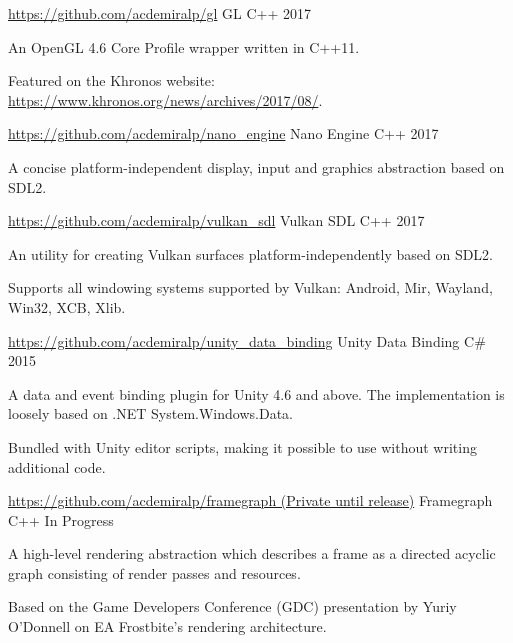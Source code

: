 \begin{cventries}
  \cventry
    {\href{https://github.com/acdemiralp/gl}{https://github.com/acdemiralp/gl}}
    {GL}
    {C++}
    {2017}
    {
      \begin{cvitems}
        \item {An OpenGL 4.6 Core Profile wrapper written in C++11.}
        \item {Featured on the Khronos website:  \href{https://www.khronos.org/news/archives/2017/08/}{https://www.khronos.org/news/archives/2017/08/}. }
      \end{cvitems}
    }
    
  \cventry
    {\href{https://github.com/acdemiralp/nano_engine}{https://github.com/acdemiralp/nano\_engine}}
    {Nano Engine}
    {C++}
    {2017}
    {
      \begin{cvitems}
        \item {A concise platform-independent display, input and graphics abstraction based on SDL2.}
      \end{cvitems}
    }
     
  \cventry
    {\href{https://github.com/acdemiralp/vulkan_sdl}{https://github.com/acdemiralp/vulkan\_sdl}}
    {Vulkan SDL}
    {C++}
    {2017}
    {
      \begin{cvitems}
        \item {An utility for creating Vulkan surfaces platform-independently based on SDL2.}
        \item {Supports all windowing systems supported by Vulkan: Android, Mir, Wayland, Win32, XCB, Xlib.}
      \end{cvitems}
    }
   
  \cventry
    {\href{https://github.com/acdemiralp/unity_data_binding}{https://github.com/acdemiralp/unity\_data\_binding}}
    {Unity Data Binding}
    {C\#}
    {2015}
    {
      \begin{cvitems}
        \item {A data and event binding plugin for Unity 4.6 and above. The implementation is loosely based on .NET System.Windows.Data.}
        \item {Bundled with Unity editor scripts, making it possible to use without writing additional code.}
      \end{cvitems}
    } 
  \cventry
    {\href{https://github.com/acdemiralp/framegraph}{https://github.com/acdemiralp/framegraph (Private until release)}}
    {Framegraph}
    {C++}
    {In Progress}
    {
      \begin{cvitems}
        \item {A high-level rendering abstraction which describes a frame as a directed acyclic graph consisting of render passes and resources.}
        \item {Based on the Game Developers Conference (GDC) presentation by Yuriy O'Donnell on EA Frostbite's rendering architecture.}
      \end{cvitems}
    }
   

\end{cventries}
